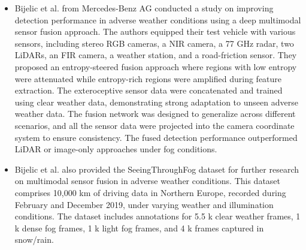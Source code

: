 \documentclass[rnd]{mas_proposal}
\begin{document}
\begin{itemize}
    \item Bijelic et al. \cite{bijelic2020seeing} from Mercedes-Benz AG conducted a study on improving detection performance in adverse weather conditions using a deep multimodal sensor fusion approach. The authors equipped their test vehicle with various sensors, including stereo RGB cameras, a NIR camera, a 77 GHz radar, two LiDARs, an FIR camera, a weather station, and a road-friction sensor. They proposed an entropy-steered fusion approach where regions with low entropy were attenuated while entropy-rich regions were amplified during feature extraction. The exteroceptive sensor data were concatenated and trained using clear weather data, demonstrating strong adaptation to unseen adverse weather data. The fusion network was designed to generalize across different scenarios, and all the sensor data were projected into the camera coordinate system to ensure consistency. The fused detection performance outperformed LiDAR or image-only approaches under fog conditions.

    \item Bijelic et al. \cite{bijelic2020seeing} also provided the SeeingThroughFog dataset for further research on multimodal sensor fusion in adverse weather conditions. This dataset comprises 10,000 km of driving data in Northern Europe, recorded during February and December 2019, under varying weather and illumination conditions. The dataset includes annotations for 5.5 k clear weather frames, 1 k dense fog frames, 1 k light fog frames, and 4 k frames captured in snow/rain.


\end{itemize}
\end{document}
